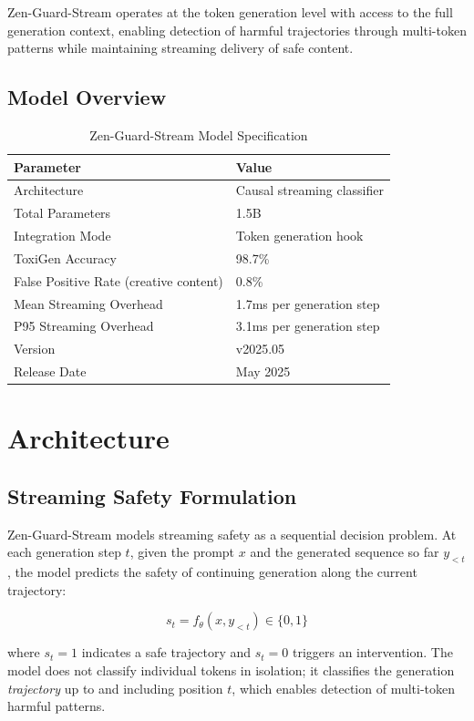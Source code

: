 \documentclass[11pt,a4paper]{article}
\begin{document}
Zen-Guard-Stream operates at the token generation level with access to the full generation context, enabling detection of harmful trajectories through multi-token patterns while maintaining streaming delivery of safe content.

\subsection{Model Overview}

\begin{table}[H]
\centering
\caption{Zen-Guard-Stream Model Specification}
\begin{tabular}{ll}
\toprule
\textbf{Parameter} & \textbf{Value} \\
\midrule
Architecture & Causal streaming classifier \\
Total Parameters & 1.5B \\
Integration Mode & Token generation hook \\
ToxiGen Accuracy & 98.7\% \\
False Positive Rate (creative content) & 0.8\% \\
Mean Streaming Overhead & 1.7ms per generation step \\
P95 Streaming Overhead & 3.1ms per generation step \\
Version & v2025.05 \\
Release Date & May 2025 \\
\bottomrule
\end{tabular}
\end{table}

\section{Architecture}

\subsection{Streaming Safety Formulation}

Zen-Guard-Stream models streaming safety as a sequential decision problem. At each generation step $t$, given the prompt $x$ and the generated sequence so far $y_{<t}$, the model predicts the safety of continuing generation along the current trajectory:

\begin{equation}
  s_t = f_\theta(x, y_{<t}) \in \{0, 1\}
\end{equation}

where $s_t = 1$ indicates a safe trajectory and $s_t = 0$ triggers an intervention. The model does not classify individual tokens in isolation; it classifies the generation \emph{trajectory} up to and including position $t$, which enables detection of multi-token harmful patterns.
\end{document}
